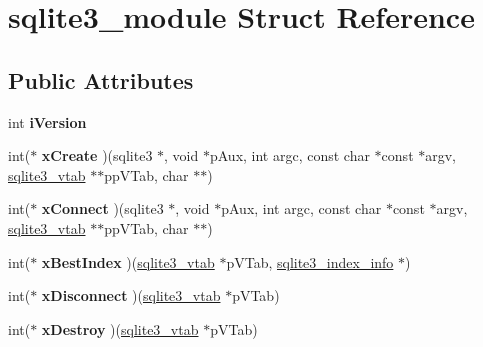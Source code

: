 \hypertarget{structsqlite3__module}{}\section{sqlite3\+\_\+module Struct Reference}
\label{structsqlite3__module}
\subsection*{Public Attributes}
\begin{DoxyCompactItemize}
\item 
\mbox{\label{structsqlite3__module_a42b11d080dc205aea43581b18f925afe}} 
int {\bfseries i\+Version}
\item 
\mbox{\label{structsqlite3__module_a5934e38da1222cac999d01d372af293e}} 
int($\ast$ {\bfseries x\+Create} )(sqlite3 $\ast$, void $\ast$p\+Aux, int argc, const char $\ast$const $\ast$argv, \mbox{\hyperlink{structsqlite3__vtab}{sqlite3\+\_\+vtab}} $\ast$$\ast$pp\+V\+Tab, char $\ast$$\ast$)
\item 
\mbox{\label{structsqlite3__module_a457fe622b5334195640e3e835c9923a8}} 
int($\ast$ {\bfseries x\+Connect} )(sqlite3 $\ast$, void $\ast$p\+Aux, int argc, const char $\ast$const $\ast$argv, \mbox{\hyperlink{structsqlite3__vtab}{sqlite3\+\_\+vtab}} $\ast$$\ast$pp\+V\+Tab, char $\ast$$\ast$)
\item 
\mbox{\label{structsqlite3__module_aad92b2cd56253baaeac656d7693ce4af}} 
int($\ast$ {\bfseries x\+Best\+Index} )(\mbox{\hyperlink{structsqlite3__vtab}{sqlite3\+\_\+vtab}} $\ast$p\+V\+Tab, \mbox{\hyperlink{structsqlite3__index__info}{sqlite3\+\_\+index\+\_\+info}} $\ast$)
\item 
\mbox{\label{structsqlite3__module_a0107afd3c350db14098edbaae04342df}} 
int($\ast$ {\bfseries x\+Disconnect} )(\mbox{\hyperlink{structsqlite3__vtab}{sqlite3\+\_\+vtab}} $\ast$p\+V\+Tab)
\item 
\mbox{\label{structsqlite3__module_a0ec3414a65bb24f400e8cfd820751412}} 
int($\ast$ {\bfseries x\+Destroy} )(\mbox{\hyperlink{structsqlite3__vtab}{sqlite3\+\_\+vtab}} $\ast$p\+V\+Tab)
\item 

\end{DoxyCompactItemize}
